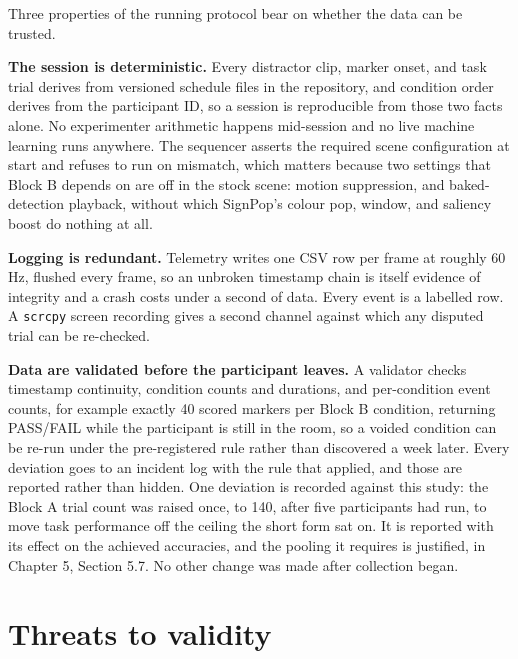 Three properties of the running protocol bear on whether the data can be trusted.

\textbf{The session is deterministic.} Every distractor clip, marker onset, and task trial derives
from versioned schedule files in the repository, and condition order derives from the participant ID,
so a session is reproducible from those two facts alone. No experimenter arithmetic happens
mid-session and no live machine learning runs anywhere. The sequencer asserts the required scene
configuration at start and refuses to run on mismatch, which matters because two settings that Block
B depends on are off in the stock scene: motion suppression, and baked-detection playback, without
which SignPop's colour pop, window, and saliency boost do nothing at all.

\textbf{Logging is redundant.} Telemetry writes one CSV row per frame at roughly 60 Hz, flushed every
frame, so an unbroken timestamp chain is itself evidence of integrity and a crash costs under a
second of data. Every event is a labelled row. A \verb|scrcpy| screen recording gives a second channel
against which any disputed trial can be re-checked.

\textbf{Data are validated before the participant leaves.} A validator checks timestamp continuity,
condition counts and durations, and per-condition event counts, for example exactly 40 scored markers
per Block B condition, returning PASS/FAIL while the participant is still in the room, so a voided
condition can be re-run under the pre-registered rule rather than discovered a week later. Every
deviation goes to an incident log with the rule that applied, and those are reported rather than
hidden. One deviation is recorded against this study: the Block A trial count was raised once, to 140,
after five participants had run, to move task performance off the ceiling the short form sat on. It is reported with its effect on the achieved accuracies, and the pooling it
requires is justified, in Chapter 5, Section 5.7. No other change was made after collection began.

\section{Threats to validity}

